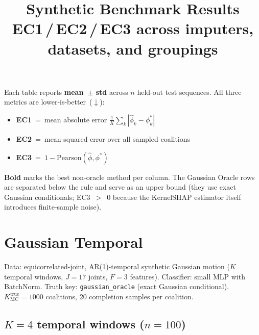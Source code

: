 \documentclass[11pt]{article}
\begin{document}
\title{Synthetic Benchmark Results\\[0.4em]
\large EC1\,/\,EC2\,/\,EC3 across imputers, datasets, and groupings}
\author{}
\date{}
\maketitle

\noindent
Each table reports \textbf{mean~$\pm$ std} across $n$ held-out test sequences.
All three metrics are lower-is-better~($\downarrow$):
\begin{itemize}\itemsep2pt
  \item \textbf{EC1}~=~mean absolute error $\frac{1}{K}\sum_k |\hat\phi_k - \phi^*_k|$
  \item \textbf{EC2}~=~mean squared error over all sampled coalitions
  \item \textbf{EC3}~=~$1 - \text{Pearson}(\hat\phi, \phi^*)$
\end{itemize}
\textbf{Bold} marks the best non-oracle method per column.
The Gaussian Oracle rows are separated below the rule and serve as an upper bound
(they use exact Gaussian conditionals; EC3~$>$~0 because the KernelSHAP estimator
itself introduces finite-sample noise).

\bigskip

\section{Gaussian Temporal}

\noindent
Data: equicorrelated-joint, AR(1)-temporal synthetic Gaussian motion
($K$ temporal windows, $J=17$ joints, $F=3$ features).
Classifier: small MLP with BatchNorm.
Truth key: \texttt{gaussian\_oracle} (exact Gaussian conditional).
$K_\mathrm{MC}^\mathrm{true}=1000$ coalitions, 20 completion samples per coalition.

\subsection{$K = 4$ temporal windows \quad ($n = 100$)}
\end{document}
